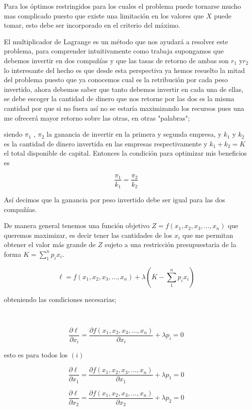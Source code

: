 \documentclass[12pt]{article}
\begin{document}
{Para los óptimos restringidos para los cuales el problema puede tornarse mucho mas complicado puesto que existe una limitación en los valores que $X$ puede tomar, esto debe ser incorporado en el criterio del máximo.

El multiplicador de Lagrange es un método que nos ayudará a resolver este problema, para comprender intuitivamente como trabaja supongamos que debemos invertir en dos compañías y que las tasas de retorno de ambas 
son $r_{1}$ y$ r_{2}$ lo interesante del hecho es que desde esta perspectiva ya hemos resuelto la mitad del problema puesto que ya conocemos cual es la retribución por cada peso invertido, ahora debemos saber que tanto debemos invertir en cada una de ellas, se debe escoger la cantidad de dinero que nos retorne por las dos es la misma cantidad por que si no fuera así no se estaría maximizando los recursos pues una me ofrecerá mayor retorno sobre las otras, en otras "palabras";

siendo $\pi_{1}$ , $\pi_{2}$ la ganancia de invertir en la primera y segunda empresa, y $k_{1}$ y $k_{2}$ es la cantidad de dinero invertida en las empresas respectivamente y $k_{1}+ k_{2} =K $ el total disponible de capital. Entonces la condición para optimizar mis beneficios es 

$$\dfrac{\pi_{1}}{k_{1}}=\dfrac{\pi_{2}}{k_{2}}$$

Así decimos que la ganancia por peso invertido debe ser igual para las dos compañías.

De manera general tenemos una función objetivo $Z=f(x_1,x_2,x_3,...,x_n)$ que queremos maximizar, es decir tener las cantidades de los $x_{i}$ que me permitan obtener el valor más grande de  $Z$ sujeto a una restricción presupuestaria de la forma $K=\sum_{1}^{n}p_{i}x_{i}$.

$$\ell=f(x_1,x_2,x_3,...,x_n) + \lambda(K-\sum_{1}^{n} p_{i}x_{i})$$

obteniendo las condiciones necesarias;

\

$$\dfrac{\partial \ell }{\partial x_{i}} = \dfrac{\partial f(x_1,x_2,x_3,...,x_n)}{\partial x_{i}}+\lambda p_{i}= 0$$

esto es para todos los $({i})$

$$\dfrac{\partial \ell }{\partial x_{1}} = \dfrac{\partial f(x_1,x_2,x_3,...,x_n)}{\partial x_{1}}+\lambda p_{1}= 0$$

$$\dfrac{\partial \ell }{\partial x_{2}} = \dfrac{\partial f(x_1,x_2,x_3,...,x_n)}{\partial x_{2}}+\lambda p_{2}= 0$$


}
\end{document}
